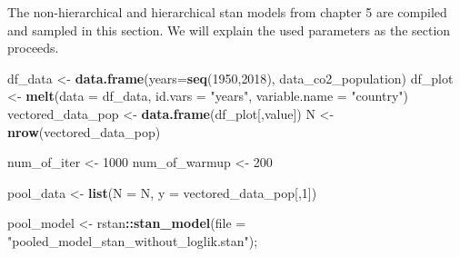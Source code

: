 \documentclass[
]{article}
\newenvironment{Shaded}{\begin{snugshade}}{\end{snugshade}}
\newcommand{\DataTypeTok}[1]{\textcolor[rgb]{0.13,0.29,0.53}{#1}}
\newcommand{\DecValTok}[1]{\textcolor[rgb]{0.00,0.00,0.81}{#1}}
\newcommand{\KeywordTok}[1]{\textcolor[rgb]{0.13,0.29,0.53}{\textbf{#1}}}
\newcommand{\NormalTok}[1]{#1}
\newcommand{\OperatorTok}[1]{\textcolor[rgb]{0.81,0.36,0.00}{\textbf{#1}}}
\newcommand{\StringTok}[1]{\textcolor[rgb]{0.31,0.60,0.02}{#1}}
\begin{document}
The non-hierarchical and hierarchical stan models from chapter 5 are
compiled and sampled in this section. We will explain the used
parameters as the section proceeds.

\begin{Shaded}
\begin{Highlighting}[]
\NormalTok{df\_data \textless{}{-}}\StringTok{ }\KeywordTok{data.frame}\NormalTok{(}\DataTypeTok{years=}\KeywordTok{seq}\NormalTok{(}\DecValTok{1950}\NormalTok{,}\DecValTok{2018}\NormalTok{), data\_co2\_population)}
\NormalTok{df\_plot \textless{}{-}}\StringTok{ }\KeywordTok{melt}\NormalTok{(}\DataTypeTok{data =}\NormalTok{ df\_data, }\DataTypeTok{id.vars =} \StringTok{"years"}\NormalTok{, }\DataTypeTok{variable.name =} \StringTok{"country"}\NormalTok{)}
\NormalTok{vectored\_data\_pop \textless{}{-}}\StringTok{ }\KeywordTok{data.frame}\NormalTok{(df\_plot[,}\StringTok{\textquotesingle{}value\textquotesingle{}}\NormalTok{])}
\NormalTok{N \textless{}{-}}\StringTok{ }\KeywordTok{nrow}\NormalTok{(vectored\_data\_pop)}


\NormalTok{num\_of\_iter \textless{}{-}}\StringTok{ }\DecValTok{1000}
\NormalTok{num\_of\_warmup \textless{}{-}}\StringTok{ }\DecValTok{200}

\NormalTok{pool\_data \textless{}{-}}\StringTok{ }\KeywordTok{list}\NormalTok{(}\DataTypeTok{N =}\NormalTok{ N,}
                  \DataTypeTok{y =}\NormalTok{ vectored\_data\_pop[,}\DecValTok{1}\NormalTok{])}

\NormalTok{pool\_model \textless{}{-}}\StringTok{ }\NormalTok{rstan}\OperatorTok{::}\KeywordTok{stan\_model}\NormalTok{(}\DataTypeTok{file =} \StringTok{"pooled\_model\_stan\_without\_loglik.stan"}\NormalTok{);}
\end{Highlighting}
\end{Shaded}
\end{document}
